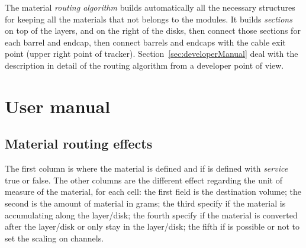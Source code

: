 \documentclass[12pt, a4paper]{article}
\begin{document}
The material \emph{routing algorithm} builds automatically all the necessary structures for
keeping all the materials that not belongs to the modules. It builds
\emph{sections} on top of the layers, and on the right of the disks,
then connect those sections for each barrel and endcap, then connect
barrels and endcaps with the cable exit point (upper right point of
tracker). Section~\ref{sec:developerManual} deal with the description
in detail of the routing algorithm from a developer point of view.




\section{User manual}\label{sec:userManual}
\subsection{Material routing effects}
The first column is where the material is defined and if is defined
with \emph{service} true or false. The other columns are the different
effect regarding the unit of measure of the material, for each cell:
the first field is the destination volume; the second is the amount of
material in grams; the third specify if the material is accumulating
along the layer/disk; the fourth specify if the material is converted
after the layer/disk or only stay in the layer/disk; the fifth if is
possible or not to set the scaling on channels.
\end{document}

